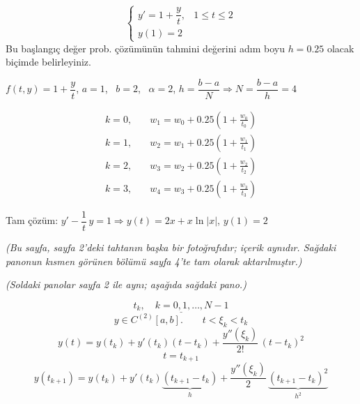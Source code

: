 \documentclass[11pt,a4paper]{article}
\begin{document}
\begin{ornek}
  \[
    \begin{cases}
      y' = 1 + \dfrac{y}{t}, & 1 \le t \le 2 \\[2mm]
      y(1) = 2
    \end{cases}
  \]
  Bu başlangıç değer prob. çözümünün tahmini değerini adım boyu $h = 0.25$ olacak biçimde
  belirleyiniz.
\end{ornek}
\begin{cozum}
  $f(t,y) = 1 + \dfrac{y}{t}$, \quad $a = 1$, \ $b = 2$, \ $\alpha = 2$, \quad
  $h = \dfrac{b-a}{N} \Rightarrow N = \dfrac{b-a}{h} = 4$


  \begin{align*}
    k = 0, &\quad w_1 = w_0 + 0.25\left(1 + \frac{w_0}{t_0}\right) \\
    k = 1, &\quad w_2 = w_1 + 0.25\left(1 + \frac{w_1}{t_1}\right) \\
    k = 2, &\quad w_3 = w_2 + 0.25\left(1 + \frac{w_2}{t_2}\right) \\
    k = 3, &\quad w_4 = w_3 + 0.25\left(1 + \frac{w_3}{t_3}\right)
  \end{align*}

  Tam çözüm: \quad
  $y' - \dfrac{1}{t}\,y = 1 \Rightarrow y(t) = 2x + x\ln|x|$, \quad $y(1) = 2$
\end{cozum}

\textit{(Bu sayfa, sayfa 2'deki tahtanın başka bir fotoğrafıdır; içerik aynıdır. Sağdaki panonun
kısmen görünen bölümü sayfa 4'te tam olarak aktarılmıştır.)}

\textit{(Soldaki panolar sayfa 2 ile aynı; aşağıda sağdaki pano.)}

\[ \underline{t_k, \quad k = 0, 1, \dots, N-1} \]
\[ y \in C^{(2)}[a,b]. \qquad t < \xi_k < t_k \]
\[ y(t) = y(t_k) + y'(t_k)(t - t_k) + \frac{y''(\xi_k)}{2!}\,(t - t_k)^2 \]
\[ \boxed{t = t_{k+1}} \]
\[
  y(t_{k+1}) = y(t_k) + y'(t_k)\underbrace{(t_{k+1} - t_k)}_{h}
             + \frac{y''(\xi_k)}{2}\,\underbrace{(t_{k+1} - t_k)^2}_{h^2}
\]
\end{document}

